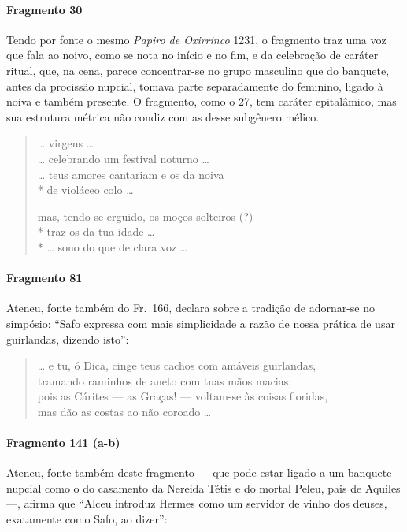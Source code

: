 {\paragraph{Fragmento 30}

{\small Tendo por fonte o mesmo \textit{Papiro de Oxirrinco} 1231, o fragmento traz uma
voz que fala ao noivo, como se nota no início e no fim, e da celebração de
caráter ritual, que, na cena, parece concentrar-se no grupo masculino que do
banquete, antes da procissão nupcial, tomava parte separadamente do feminino,
ligado à noiva e também presente. O fragmento, como o 27, tem caráter
epitalâmico, mas sua estrutura métrica não condiz com as desse subgênero
mélico.}

\begin{verse}
\ldots{} virgens \ldots{}\\
\ldots{} celebrando um festival noturno \ldots{}\\
\ldots{} teus amores cantariam e os da noiva\\*
de violáceo colo \ldots{}

mas, tendo se erguido, os moços solteiros (?)\\*
traz os da tua idade \ldots{}\\*
\ldots{} sono do que de clara voz \ldots{}
\end{verse}

\paragraph{Fragmento 81}

{\small Ateneu, fonte também do Fr.~166, declara sobre a tradição de adornar-se no
simpósio: ``Safo expressa com mais simplicidade a razão de nossa prática
de usar guirlandas, dizendo isto”:}

\begin{verse}
\ldots{} e tu, ó Dica, cinge teus cachos com amáveis guirlandas,\\
tramando raminhos de aneto com tuas mãos macias;\\
pois as Cárites --- as Graças! --- voltam-se às coisas floridas,\\
mas dão as costas ao não coroado \ldots{}
\end{verse}

\paragraph{Fragmento 141 (a-b)}

{\small Ateneu, fonte também deste fragmento --- que pode estar ligado a um banquete
nupcial como o do casamento da Nereida Tétis e do mortal Peleu, pais de Aquiles
---, afirma que ``Alceu introduz Hermes como um servidor de vinho dos
deuses, exatamente como Safo, ao dizer'':}

}
